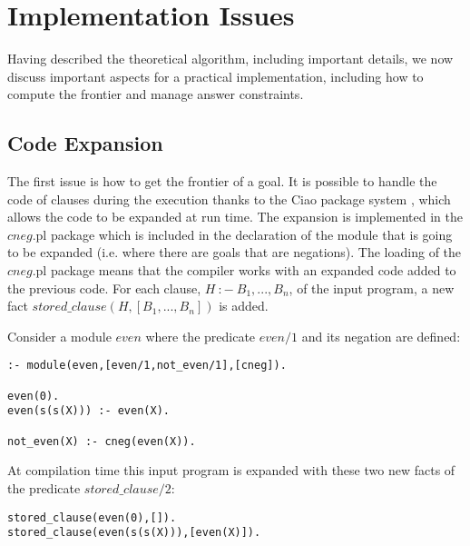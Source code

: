\documentclass{tlp}
\begin{document}
    


\section{Implementation Issues}
\label{implementation}

Having described the theoretical algorithm, including important
details, we now discuss important aspects for a practical
implementation, including how to compute the frontier and manage
answer constraints.


\vspace{-0.1in}
\subsection{Code Expansion}
\label{expansion}

The first issue is how to get the frontier of a goal. It is possible to handle
the code of clauses during the execution thanks to the Ciao package system
\cite{ciao-modules-cl2000}, which allows the code to be expanded at run
time. The expansion is implemented in the $cneg$.pl package which is included
in the declaration of the module that is going to be expanded (i.e. where
there are goals that are negations). The loading of the $cneg$.pl package
means that the compiler works with an expanded code added to the previous
code. For each clause, $H~:-~B_1,...,B_n$, of the input program, a new fact
$stored\_clause(H,[B_1,...,B_n])$ is added.

Consider a module $even$ where the predicate $even/1$ and its negation are
defined: 

\begin{verbatim}
:- module(even,[even/1,not_even/1],[cneg]).

even(0).
even(s(s(X))) :- even(X).

not_even(X) :- cneg(even(X)).
\end{verbatim}

At compilation time this input program is expanded with these two new facts of
the predicate $stored\_clause/2$:  

\begin{verbatim}
stored_clause(even(0),[]).
stored_clause(even(s(s(X))),[even(X)]).
\end{verbatim}
\end{document}
